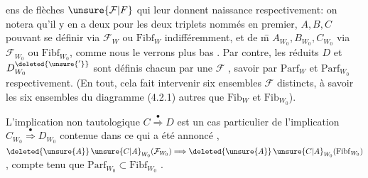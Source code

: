 
ens de flèches $\unsure{\mathcal{F}|F}$ qui leur donnent naissance respectivement: on notera qu'il y en a deux pour les deux triplets nommés en premier, $A,B,C$ pouvant se définir via $\mathcal{F}_{W}$ ou $\mathrm{Fibf}_{W}$ indifféremment, et de \={m} $A_{W_0},B_{W_0},C_{W_0}$ via $\mathcal{F}_{W_0}$ ou $\mathrm{Fibf}_{W_0}$, comme  nous le verrons plus bas . Par contre, les   réduits $D$ et $D^{\deleted{\unsure{'}}}_{W_0}$ sont définis chacun par  une $\mathcal{F}$ , savoir par $\mathrm{Parf}_{W}$ et $\mathrm{Parf}_{W_0}$ respectivement. (En tout, cela fait intervenir six ensembles $\mathcal{F}$ distincts, à savoir les six ensembles du diagramme (4.2.1) autres que $\mathrm{Fib}_{W}$ et $\mathrm{Fib}_{W_0}$).

L'implication non tautologique $C\overset{\bullet}{\Longrightarrow}D$ est un cas particulier de l'implication $C_{W_0}\overset{\bullet}{\Longrightarrow}D_{W_0}$   contenue dans ce qui a été annoncé  ,   $\deleted{\unsure{A}}\,\unsure{C|A}_{W_0}(\mathcal{F}_{W_0})\Longrightarrow \deleted{\unsure{A}}\,\unsure{C|A}_{W_0}(\mathrm{Fibf}_{W_0})$, 
compte tenu que $\mathrm{Parf}_{W_0}\subset\mathrm{Fibf}_{W_0}$ . 
